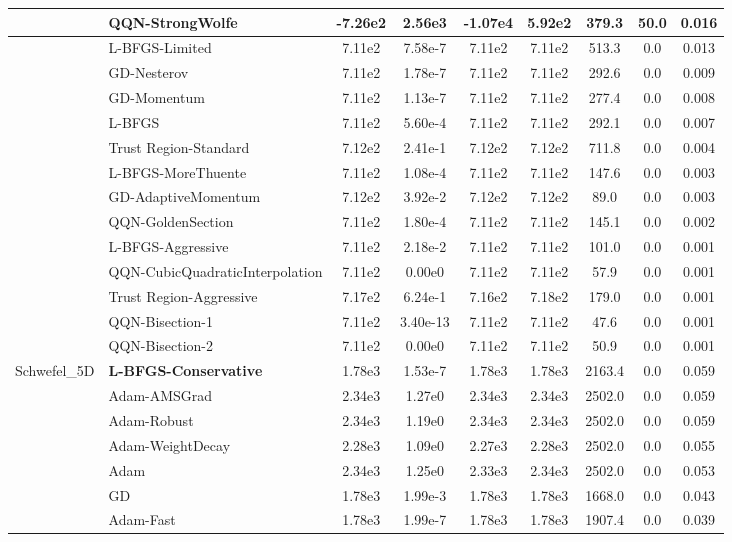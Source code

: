 \documentclass{article}
\begin{document}
\begin{longtable}{|l|l|c|c|c|c|c|c|c|}
\hline
 & QQN-StrongWolfe & -7.26e2 & 2.56e3 & -1.07e4 & 5.92e2 & 379.3 & 50.0 & 0.016 \\
\hline
 & L-BFGS-Limited & 7.11e2 & 7.58e-7 & 7.11e2 & 7.11e2 & 513.3 & 0.0 & 0.013 \\
\hline
 & GD-Nesterov & 7.11e2 & 1.78e-7 & 7.11e2 & 7.11e2 & 292.6 & 0.0 & 0.009 \\
\hline
 & GD-Momentum & 7.11e2 & 1.13e-7 & 7.11e2 & 7.11e2 & 277.4 & 0.0 & 0.008 \\
\hline
 & L-BFGS & 7.11e2 & 5.60e-4 & 7.11e2 & 7.11e2 & 292.1 & 0.0 & 0.007 \\
\hline
 & Trust Region-Standard & 7.12e2 & 2.41e-1 & 7.12e2 & 7.12e2 & 711.8 & 0.0 & 0.004 \\
\hline
 & L-BFGS-MoreThuente & 7.11e2 & 1.08e-4 & 7.11e2 & 7.11e2 & 147.6 & 0.0 & 0.003 \\
\hline
 & GD-AdaptiveMomentum & 7.12e2 & 3.92e-2 & 7.12e2 & 7.12e2 & 89.0 & 0.0 & 0.003 \\
\hline
 & QQN-GoldenSection & 7.11e2 & 1.80e-4 & 7.11e2 & 7.11e2 & 145.1 & 0.0 & 0.002 \\
\hline
 & L-BFGS-Aggressive & 7.11e2 & 2.18e-2 & 7.11e2 & 7.11e2 & 101.0 & 0.0 & 0.001 \\
\hline
 & QQN-CubicQuadraticInterpolation & 7.11e2 & 0.00e0 & 7.11e2 & 7.11e2 & 57.9 & 0.0 & 0.001 \\
\hline
 & Trust Region-Aggressive & 7.17e2 & 6.24e-1 & 7.16e2 & 7.18e2 & 179.0 & 0.0 & 0.001 \\
\hline
 & QQN-Bisection-1 & 7.11e2 & 3.40e-13 & 7.11e2 & 7.11e2 & 47.6 & 0.0 & 0.001 \\
\hline
 & QQN-Bisection-2 & 7.11e2 & 0.00e0 & 7.11e2 & 7.11e2 & 50.9 & 0.0 & 0.001 \\
Schwefel\_5D & \textbf{L-BFGS-Conservative} & 1.78e3 & 1.53e-7 & 1.78e3 & 1.78e3 & 2163.4 & 0.0 & 0.059 \\
\hline
 & Adam-AMSGrad & 2.34e3 & 1.27e0 & 2.34e3 & 2.34e3 & 2502.0 & 0.0 & 0.059 \\
\hline
 & Adam-Robust & 2.34e3 & 1.19e0 & 2.34e3 & 2.34e3 & 2502.0 & 0.0 & 0.059 \\
\hline
 & Adam-WeightDecay & 2.28e3 & 1.09e0 & 2.27e3 & 2.28e3 & 2502.0 & 0.0 & 0.055 \\
\hline
 & Adam & 2.34e3 & 1.25e0 & 2.33e3 & 2.34e3 & 2502.0 & 0.0 & 0.053 \\
\hline
 & GD & 1.78e3 & 1.99e-3 & 1.78e3 & 1.78e3 & 1668.0 & 0.0 & 0.043 \\
\hline
 & Adam-Fast & 1.78e3 & 1.99e-7 & 1.78e3 & 1.78e3 & 1907.4 & 0.0 & 0.039 \\

\end{longtable}
\end{document}
